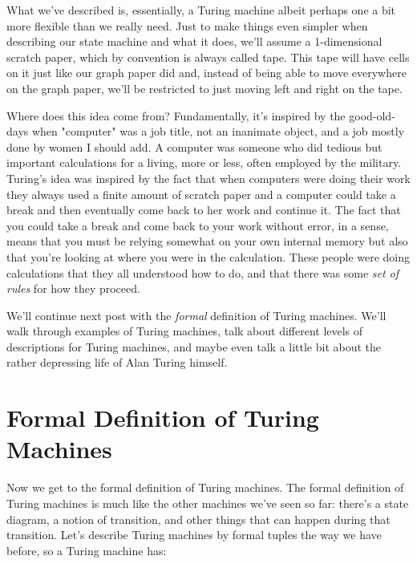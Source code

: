 \documentclass[11pt]{article}
\begin{document}
What we've described is, essentially, a Turing machine albeit perhaps one a bit more flexible than we really need.  Just to make things even simpler when describing our state machine and what it does, we'll assume a 1-dimensional scratch paper, which by convention is always called tape. This tape will have cells on it just like our graph paper did and, instead of being able to move everywhere on the graph paper, we'll be restricted to just moving left and right on the tape.

Where does this idea come from? Fundamentally, it's inspired by the good-old-days when "computer" was a job title, not an inanimate object, and a job mostly done by women I should add. A computer was someone who did tedious but important calculations for a living, more or less, often employed by the military. Turing's idea was inspired by the fact that when computers were doing their work they always used a finite amount of scratch paper and a computer could take a break and then eventually come back to her work and continue it. The fact that you could take a break and come back to your work without error, in a sense, means that you must be relying somewhat on your own internal memory but also that you're looking at where you were in the calculation. These people were doing calculations that they all understood how to do, and that there was some \emph{set of rules} for how they proceed. 

We'll continue next post with the \emph{formal} definition of Turing machines. We'll walk through examples of Turing machines, talk about different levels of descriptions for Turing machines, and maybe even talk a little bit about the rather depressing life of Alan Turing himself. 
\section{Formal Definition of Turing Machines}
\label{sec-10}
Now we get to the formal definition of Turing machines. The formal definition of Turing machines is much like the other machines we've seen so far: there's a state diagram, a notion of transition, and other things that can happen during that transition. Let's describe Turing machines by formal tuples the way we have before, so a Turing machine has:
\end{document}
